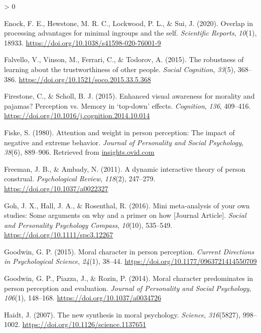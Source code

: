 \documentclass[
  english,
  man]{apa6}
\newlength{\cslhangindent}
\newenvironment{CSLReferences}[2] %
 {%
  \setlength{\parindent}{0pt}
  \ifodd #1 \everypar{\setlength{\hangindent}{\cslhangindent}}\ignorespaces\fi
  \ifnum #2 > 0
  \setlength{\parskip}{#2\baselineskip}
  \fi
 }%
 {}
\begin{document}
\begin{CSLReferences}{1}{0}
\leavevmode\hypertarget{ref-enock_overlap_2020}{}%
Enock, F. E., Hewstone, M. R. C., Lockwood, P. L., \& Sui, J. (2020). Overlap in processing advantages for minimal ingroups and the self. \emph{Scientific Reports}, \emph{10}(1), 18933. \url{https://doi.org/10.1038/s41598-020-76001-9}

\leavevmode\hypertarget{ref-falvello_robustness_2015}{}%
Falvello, V., Vinson, M., Ferrari, C., \& Todorov, A. (2015). The robustness of learning about the trustworthiness of other people. \emph{Social Cognition}, \emph{33}(5), 368--386. \url{https://doi.org/10.1521/soco.2015.33.5.368}

\leavevmode\hypertarget{ref-firestone_enhanced_2015}{}%
Firestone, C., \& Scholl, B. J. (2015). Enhanced visual awareness for morality and pajamas? Perception vs. Memory in {`top-down'} effects. \emph{Cognition}, \emph{136}, 409--416. \url{https://doi.org/10.1016/j.cognition.2014.10.014}

\leavevmode\hypertarget{ref-fiske_attention_1980}{}%
Fiske, S. (1980). Attention and weight in person perception: The impact of negative and extreme behavior. \emph{Journal of Personality and Social Psychology}, \emph{38}(6), 889--906. Retrieved from \href{https://insights.ovid.com}{insights.ovid.com}

\leavevmode\hypertarget{ref-freeman_dynamic_2011}{}%
Freeman, J. B., \& Ambady, N. (2011). A dynamic interactive theory of person construal. \emph{Psychological Review}, \emph{118}(2), 247--279. \url{https://doi.org/10.1037/a0022327}

\leavevmode\hypertarget{ref-Goh_2016_mini}{}%
Goh, J. X., Hall, J. A., \& Rosenthal, R. (2016). Mini meta-analysis of your own studies: Some arguments on why and a primer on how {[}Journal Article{]}. \emph{Social and Personality Psychology Compass}, \emph{10}(10), 535--549. \url{https://doi.org/10.1111/spc3.12267}

\leavevmode\hypertarget{ref-goodwin_moral_2015}{}%
Goodwin, G. P. (2015). Moral character in person perception. \emph{Current Directions in Psychological Science}, \emph{24}(1), 38--44. \url{https://doi.org/10.1177/0963721414550709}

\leavevmode\hypertarget{ref-goodwin_moral_2014}{}%
Goodwin, G. P., Piazza, J., \& Rozin, P. (2014). Moral character predominates in person perception and evaluation. \emph{Journal of Personality and Social Psychology}, \emph{106}(1), 148--168. \url{https://doi.org/10.1037/a0034726}

\leavevmode\hypertarget{ref-haidt_new_2007}{}%
Haidt, J. (2007). The new synthesis in moral psychology. \emph{Science}, \emph{316}(5827), 998--1002. \url{https://doi.org/10.1126/science.1137651}


\end{CSLReferences}
\end{document}
